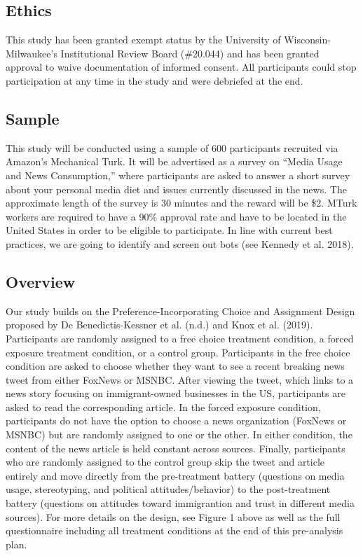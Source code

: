 \documentclass[]{article}
\begin{document}
\hypertarget{ethics}{%
\subsection{Ethics}\label{ethics}}

This study has been granted exempt status by the University of
Wisconsin-Milwaukee's Institutional Review Board (\#20.044) and has been
granted approval to waive documentation of informed consent. All
participants could stop participation at any time in the study and were
debriefed at the end.

\hypertarget{sample}{%
\subsection{Sample}\label{sample}}

This study will be conducted using a sample of 600 participants
recruited via Amazon's Mechanical Turk. It will be advertised as a
survey on ``Media Usage and News Consumption,'' where participants are
asked to answer a short survey about your personal media diet and issues
currently discussed in the news. The approximate length of the survey is
30 minutes and the reward will be \$2. MTurk workers are required to
have a 90\% approval rate and have to be located in the United States in
order to be eligible to participate. In line with current best
practices, we are going to identify and screen out bots (see Kennedy et
al. 2018).

\hypertarget{overview}{%
\subsection{Overview}\label{overview}}

Our study builds on the Preference-Incorporating Choice and Assignment
Design proposed by De Benedictis-Kessner et al. (n.d.) and Knox et al.
(2019). Participants are randomly assigned to a free choice treatment
condition, a forced exposure treatment condition, or a control group.
Participants in the free choice condition are asked to choose whether
they want to see a recent breaking news tweet from either FoxNews or
MSNBC. After viewing the tweet, which links to a news story focusing on
immigrant-owned businesses in the US, participants are asked to read the
corresponding article. In the forced exposure condition, participants do
not have the option to choose a news organization (FoxNews or MSNBC) but
are randomly assigned to one or the other. In either condition, the
content of the news article is held constant across sources. Finally,
participants who are randomly assigned to the control group skip the
tweet and article entirely and move directly from the pre-treatment
battery (questions on media usage, stereotyping, and political
attitudes/behavior) to the post-treatment battery (questions on
attitudes toward immigrantion and trust in different media sources). For
more details on the design, see Figure 1 above as well as the full
questionnaire including all treatment conditions at the end of this
pre-analysis plan.
\end{document}
